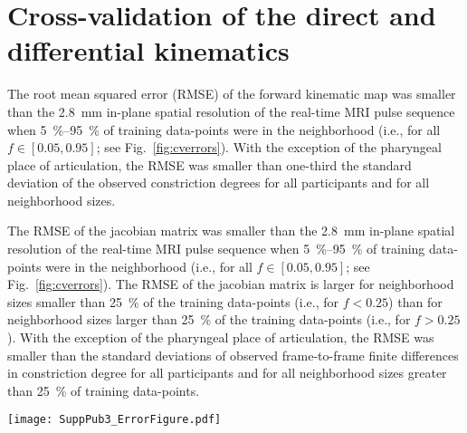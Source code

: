 \documentclass[reprint]{JASAnew}\usepackage[]{graphicx}\usepackage[]{color}
\begin{document}
\section{Cross-validation of the direct and differential kinematics}
\label{sec:crossvalidation}

The root mean squared error (RMSE) of the forward kinematic map was smaller than the \SI{2.8}{\milli\meter} in-plane spatial resolution of the real-time MRI pulse sequence when \SIrange{5}{95}{\percent} of training data-points were in the neighborhood (i.e., for all $f\in \left[ 0.05, 0.95\right]$; see Fig.~\ref{fig:cverrors}). With the exception of the pharyngeal place of articulation, the RMSE was smaller than one-third the standard deviation of the observed constriction degrees for all participants and for all neighborhood sizes.

The RMSE of the jacobian matrix was smaller than the \SI{2.8}{\milli\meter} in-plane spatial resolution of the real-time MRI pulse sequence when \SIrange{5}{95}{\percent} of training data-points were in the neighborhood (i.e., for all $f\in \left[ 0.05, 0.95\right]$; see Fig.~\ref{fig:cverrors}).
%
The RMSE of the jacobian matrix is larger for neighborhood sizes smaller than \SI{25}{\percent} of the training data-points (i.e., for $f<0.25$) than for neighborhood sizes larger than \SI{25}{\percent} of the training data-points (i.e., for $f>0.25$). 
%
With the exception of the pharyngeal place of articulation, the RMSE was smaller than the standard deviations of observed frame-to-frame finite differences in constriction degree for all participants and for all neighborhood sizes greater than \SI{25}{\percent} of training data-points. 

\begin{figure*}
\raggedright
\texttt{[image: SuppPub3\_ErrorFigure.pdf]}
\caption{
{\bf (a)} Median error (line) and 10\textsuperscript{th}-90\textsuperscript{th} percentile error range (shaded) of the forward kinematic map estimator of constriction task variables. {\bf (b)} Median error (line) and 10\textsuperscript{th}-90\textsuperscript{th} percentile error range (shaded) of the jacobian matrix estimator of frame-to-frame finite differences in constriction task variables. 
Data-points are the errors computed over all 10 folds of cross-validation.
Neighborhood size is given as percentage of training data-points.
The standard deviation of observed (frame-to-frame finite differences in) constriction task variables is indicated as a tick mark on the right $y$-axis whenever the standard deviation is small enough to fit within the $y$-axis limits.}
\label{fig:cverrors}
\end{figure*}
\end{document}
